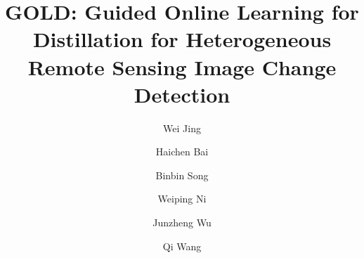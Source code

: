 \documentclass[a4paper,fleqn]{cas-dc}
\begin{document}
\let\WriteBookmarks\relax
\def\floatpagepagefraction{1}
\def\textpagefraction{.001}

\title [mode = title]{GOLD: Guided Online Learning for Distillation for Heterogeneous Remote Sensing Image Change Detection}

\tnotetext[1]{}

\author[1,2]{Wei Jing}

\author[2]{Haichen Bai}

\author[2]{Binbin Song}

\author[3]{Weiping Ni}

\author[3]{Junzheng Wu}

\author[2]{Qi Wang}

\address[1]{National Elite Institute of Engineering, Northwestern Polytechnical University, Xi'an 710072, China}
\address[2]{School of Artificial Intelligence, OPtics and ElectroNics (iOPEN), Northwestern Polytechnical University, Xi'an 710072, China}
\address[3]{Department of Remote Sensing, Northwest Institute of Nuclear Technology, Xi'an 710072, China}
\end{document}
